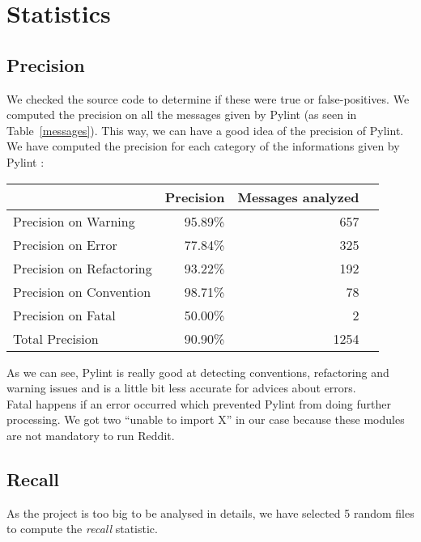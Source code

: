 \documentclass[11pt, a4paper]{article}
\newcommand{\tit}[1]{\textit{#1}}
\newcommand{\pyl}{\textsf{Pylint}}
\begin{document}
\bigskip
\section{Statistics}

\subsection*{Precision}

We checked the source code to determine if these were true or false-positives. We computed the precision on all the messages given by \pyl{} (as seen in Table~\ref{messages}). This way, we can have a good idea of the precision of \pyl{}.\\

We have computed the precision for each category of the informations given by \pyl{} :

\begin{longtable}{|l|r|r|m{9.2cm}|}
\cline{2-3}
\multicolumn{1}{c|}{} & \textbf{\small{Precision}} & \textbf{\small{Messages analyzed}} \\
\cline{2-3}
\hline
Precision on Warning & 95.89\% & 657 \\
Precision on Error & 77.84\% & 325 \\
Precision on Refactoring & 93.22\% & 192 \\
Precision on Convention & 98.71\% & 78 \\
Precision on Fatal & 50.00\% & 2 \\
\hline
Total Precision & 90.90\% & 1254 \\
\hline
\end{longtable}

As we can see, \pyl{} is really good at detecting conventions, refactoring and warning issues and is a little bit less accurate for advices about errors. \\

Fatal happens if an error occurred which prevented \pyl{} from doing further processing. We got two \enquote{unable to import X} in our case because these modules are not mandatory to run Reddit.

\subsection*{Recall}

As the project is too big to be analysed in details, we have selected 5 random files to compute the \tit{recall} statistic. \\
\end{document}
